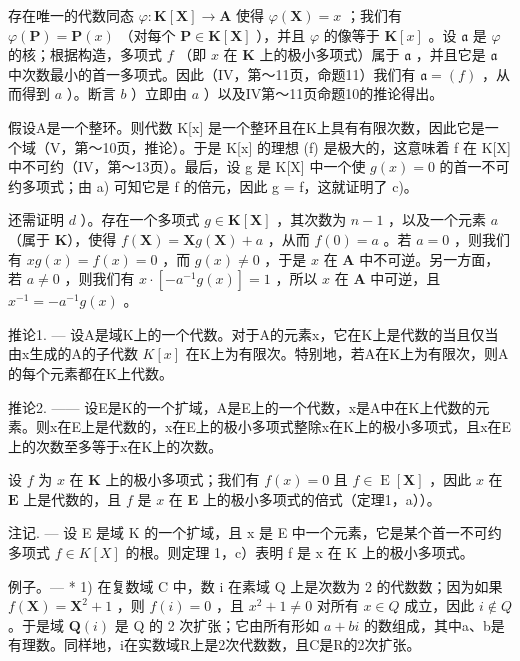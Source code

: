 存在唯一的代数同态 \(\varphi: \mathbf{K}[\mathbf{X}] \to \mathbf{A}\) 使得 \(\varphi(\mathbf{X}) = x\) ；我们有 \(\varphi(\mathbf{P}) = \mathbf{P}(x)\) （对每个 \(\mathbf{P} \in \mathbf{K}[\mathbf{X}]\) ），并且 \(\varphi\) 的像等于 \(\mathbf{K}[x]\) 。设 \(\mathfrak{a}\) 是 \(\varphi\) 的核；根据构造，多项式 \(f\) （即 \(x\) 在 \(\mathbf{K}\) 上的极小多项式）属于 \(\mathfrak{a}\) ，并且它是 \(\mathfrak{a}\) 中次数最小的首一多项式。因此（IV，第～11页，命题11）我们有 \(\mathfrak{a} = (f)\) ，从而得到 \(a\) ）。断言 \(b\) ）立即由 \(a\) ）以及IV第～11页命题10的推论得出。

假设A是一个整环。则代数 K{[}x{]} 是一个整环且在K上具有有限次数，因此它是一个域（V，第～10页，推论）。于是 K{[}x{]} 的理想 (f) 是极大的，这意味着 f 在 K{[}X{]} 中不可约（IV，第～13页）。最后，设 g 是 K{[}X{]} 中一个使 \(g(x) = 0\) 的首一不可约多项式；由 a) 可知它是 f 的倍元，因此 g = f，这就证明了 c)。

还需证明 \(d\) ）。存在一个多项式 \(g \in \mathbf{K}[\mathbf{X}]\) ，其次数为 \(n - 1\) ，以及一个元素 \(a\) （属于 \(\mathbf{K}\)），使得 \(f(\mathbf{X}) = \mathbf{X}g(\mathbf{X}) + a\) ，从而 \(f(0) = a\) 。若 \(a = 0\) ，则我们有 \(xg(x) = f(x) = 0\) ，而 \(g(x) \neq 0\) ，于是 \(x\) 在 \(\mathbf{A}\) 中不可逆。另一方面，若 \(a \neq 0\) ，则我们有 \(x \cdot [-a^{-1}g(x)] = 1\) ，所以 \(x\) 在 \(\mathbf{A}\) 中可逆，且 \(x^{-1} = -a^{-1}g(x)\) 。

推论1. --- 设A是域K上的一个代数。对于A的元素x，它在K上是代数的当且仅当由x生成的A的子代数 \(K[x]\) 在K上为有限次。特别地，若A在K上为有限次，则A的每个元素都在K上代数。

推论2. —— 设E是K的一个扩域，A是E上的一个代数，x是A中在K上代数的元素。则x在E上是代数的，x在E上的极小多项式整除x在K上的极小多项式，且x在E上的次数至多等于x在K上的次数。

设 \(f\) 为 \(x\) 在 \(\mathbf{K}\) 上的极小多项式；我们有 \(f(x) = 0\) 且 \(f \in \operatorname{E}[\mathbf{X}]\) ，因此 \(x\) 在 \(\mathbf{E}\) 上是代数的，且 \(f\) 是 \(x\) 在 \(\mathbf{E}\) 上的极小多项式的倍式（定理1，a））。

注记. --- 设 E 是域 K 的一个扩域，且 x 是 E 中一个元素，它是某个首一不可约多项式 \(f \in K[X]\) 的根。则定理 1，c）表明 f 是 x 在 K 上的极小多项式。

例子。--- * 1) 在复数域 C 中，数 i 在素域 Q 上是次数为 2 的代数数；因为如果 \(f(\mathbf{X}) = \mathbf{X}^{2} + 1\) ，则 \(f(i) = 0\) ，且 \(x^{2} + 1 \neq 0\) 对所有 \(x \in Q\) 成立，因此 \(i \notin Q\) 。于是域 \(\mathbf{Q}(i)\) 是 Q 的 2 次扩张；它由所有形如 \(a + bi\) 的数组成，其中a、b是有理数。同样地，i在实数域R上是2次代数数，且C是R的2次扩张。

